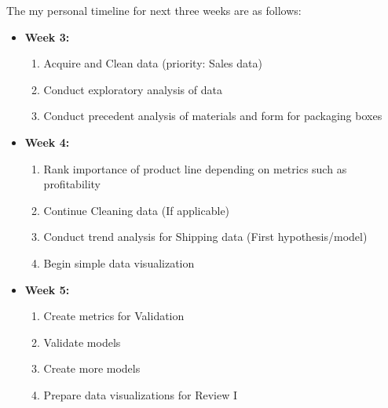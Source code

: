\documentclass[a4paper, fleqn]{article}
\begin{document}
The my personal timeline for next three weeks are as follows:
\begin{itemize}
\item \textbf{Week 3:}    \begin{enumerate}
\item Acquire and Clean data (priority: Sales data)
\item Conduct exploratory analysis of data
\item Conduct precedent analysis of materials and form for packaging boxes
\end{enumerate}
\item \textbf{Week 4:}     \begin{enumerate}
\item Rank importance of product line depending on metrics such as profitability
\item Continue Cleaning data (If applicable)
\item Conduct trend analysis for Shipping data (First hypothesis/model)
\item Begin simple data visualization
\end{enumerate}
\item \textbf{Week 5:}    \begin{enumerate}
\item Create metrics for Validation
\item Validate models
\item Create more models
\item Prepare data visualizations for Review I
\end{enumerate}
\end{itemize}
\end{document}

